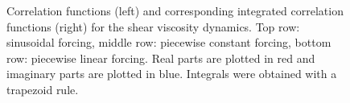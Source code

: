 \begin{figure}[htbp]
\begin{center}
      \caption{ \label{fig:sv_correlations}
        Correlation functions (left) and corresponding integrated correlation functions (right) for the shear viscosity dynamics. Top row: sinusoidal forcing, middle row: piecewise constant forcing, bottom row: piecewise linear forcing.
        Real parts are plotted in red and imaginary parts are plotted in blue. Integrals were obtained with a trapezoid rule.
      }
    \end{center}
  \end{figure}